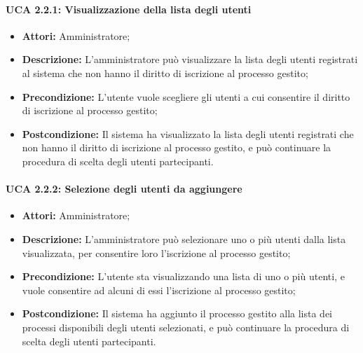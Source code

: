 \paragraph{UCA 2.2.1: Visualizzazione della lista degli utenti}
\begin{itemize}
\item \textbf{Attori:}
 Amministratore;
\item \textbf{Descrizione:} 
L'amministratore può visualizzare la lista degli utenti registrati al sistema che non hanno il diritto di iscrizione al processo gestito; 
\item \textbf{Precondizione:} 
L'utente vuole scegliere gli utenti a cui consentire il diritto di iscrizione al processo gestito; 
\item \textbf{Postcondizione:} 
Il sistema ha visualizzato la lista degli utenti registrati che non hanno il diritto di iscrizione al processo gestito, e può continuare la procedura di scelta degli utenti partecipanti.
\end{itemize}

\paragraph{UCA 2.2.2: Selezione degli utenti da aggiungere}
\begin{itemize}
\item \textbf{Attori:}
 Amministratore;
\item \textbf{Descrizione:} 
L'amministratore può selezionare uno o più utenti dalla lista visualizzata, per consentire loro l'iscrizione al processo gestito; 
\item \textbf{Precondizione:} 
L'utente sta visualizzando una lista di uno o più utenti, e vuole consentire ad alcuni di essi l'iscrizione al processo gestito; 
\item \textbf{Postcondizione:} 
Il sistema ha aggiunto il processo gestito alla lista dei processi disponibili degli utenti selezionati, e può continuare la procedura di scelta degli utenti partecipanti.
\end{itemize}

